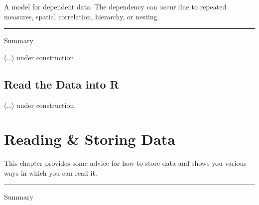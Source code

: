 \documentclass[
]{book}
\begin{document}
A model for dependent data. The dependency can occur due to repeated measures, spatial correlation, hierarchy, or nesting.

\begin{center}\rule{0.5\linewidth}{0.5pt}\end{center}

Summary

(\ldots) under construction.

\hypertarget{read-the-data-into-r-1}{%
\section{Read the Data into R}\label{read-the-data-into-r-1}}

(\ldots) under construction.

\hypertarget{reading-storing-data}{%
\chapter{Reading \& Storing Data}\label{reading-storing-data}}

This chapter provides some advice for how to store data and shows you various ways in which you can read it.

\begin{center}\rule{0.5\linewidth}{0.5pt}\end{center}

Summary
\end{document}
